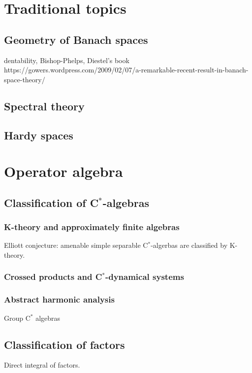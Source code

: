 \documentclass[a4paper]{report}
\begin{document}
\tableofcontents

\part{Traditional topics}
\chapter{Geometry of Banach spaces}
dentability, Bishop-Phelps, Diestel's book
https://gowers.wordpress.com/2009/02/07/a-remarkable-recent-result-in-banach-space-theory/
\chapter{Spectral theory}
\chapter{Hardy spaces}











\part{Operator algebra}

\chapter{Classification of C$^*$-algebras}

\section{K-theory and approximately finite algebras}
Elliott conjecture: amenable simple separable C$^*$-algerbas are classified by K-theory.
\section{Crossed products and C$^*$-dynamical systems}
\section{Abstract harmonic analysis}
Group C$^*$ algebras






\chapter{Classification of factors}
Direct integral of factors.
\end{document}
